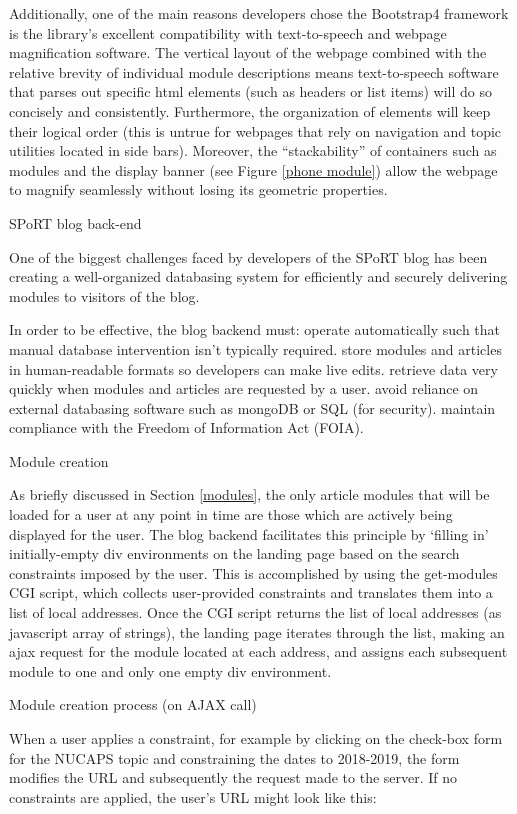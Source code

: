 Additionally, one of the main reasons developers chose the Bootstrap4 framework is the library's excellent compatibility with text-to-speech and webpage magnification software. The vertical layout of the webpage combined with the relative brevity of individual module descriptions means text-to-speech software that parses out specific html elements (such as headers or list items) will do so concisely and consistently. Furthermore, the organization of elements will keep their logical order (this is untrue for webpages that rely on navigation and topic utilities located in side bars). Moreover, the ``stackability'' of containers such as modules and the display banner (see Figure \ref{phone module}) allow the webpage to magnify seamlessly without losing its geometric properties.

SPoRT blog back-end

One of the biggest challenges faced by developers of the SPoRT blog has been creating a well-organized databasing system for efficiently and securely delivering modules to visitors of the blog.

In order to be effective, the blog backend must:
operate automatically such that manual database intervention isn't typically required.
store modules and articles in human-readable formats so developers can make live edits.
retrieve data very quickly when modules and articles are requested by a user.
avoid reliance on external databasing software such as mongoDB or SQL (for security).
maintain compliance with the Freedom of Information Act (FOIA). \cite{foia20}

Module creation

As briefly discussed in Section \ref{modules}, the only article modules that will be loaded for a user at any point in time are those which are actively being displayed for the user. The blog backend facilitates this principle by `filling in' initially-empty div environments on the landing page based on the search constraints imposed by the user. This is accomplished by using the get-modules CGI script, which collects user-provided constraints and translates them into a list of local addresses. Once the CGI script returns the list of local addresses (as javascript array of strings), the landing page iterates through the list, making an ajax request for the module located at each address, and assigns each subsequent module to one and only one empty div environment.

Module creation process (on AJAX call)

When a user applies a constraint, for example by clicking on the check-box form for the NUCAPS topic and constraining the dates to 2018-2019, the form modifies the URL and subsequently the request made to the server. If no constraints are applied, the user's URL might look like this:

